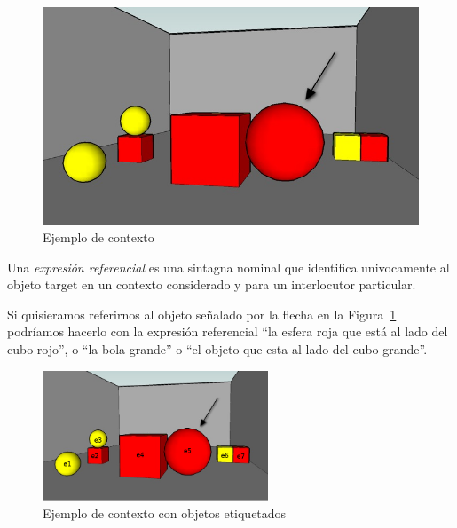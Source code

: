  
\begin{figure}[ht]
\centering
\includegraphics[scale=.4]{images/22sinletras.jpg}
\caption{Ejemplo de contexto}
\label{GRE3D7-stimulus1}

\end{figure}

%

Una \emph{expresi\'on referencial} es una sintagna nominal que identifica univocamente al objeto target en un contexto considerado y para un interlocutor particular.

Si quisieramos referirnos al objeto se\~nalado por la flecha en la Figura~\ref{GRE3D7-stimulus1} podr\'iamos hacerlo con la expresi\'on referencial ``la
esfera roja que est\'a al lado del cubo rojo'', o ``la bola grande'' o ``el objeto que esta al lado del cubo grande''. 

\begin{figure}[ht]
\centering
\includegraphics[width=0.6\textwidth]{images/22.jpg}
\caption{Ejemplo de contexto con objetos etiquetados}
\label{GRE3D7-stimulus2}
\end{figure}


